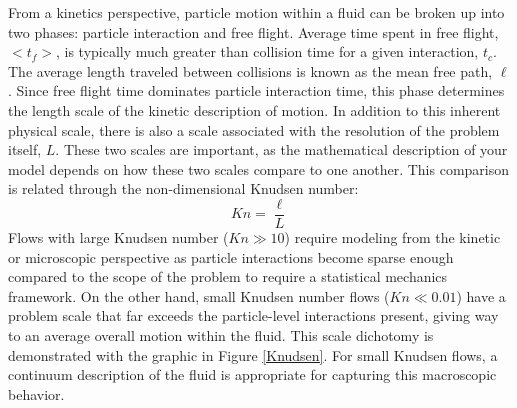 From a kinetics perspective, particle motion within a fluid can be broken up into two phases: particle interaction and free flight. Average time spent in free flight, $<t_f>$, is typically much greater than collision time for a given interaction, $t_c$. The average length traveled between collisions is known as the mean free path, $\ell$.  Since free flight time dominates particle interaction time, this phase determines the length scale of the kinetic description of motion. In addition to this inherent physical scale, there is also a scale associated with the resolution of the problem itself, $L$. These two scales are important, as the mathematical description of your model depends on how these two scales compare to one another. This comparison is related through the non-dimensional Knudsen number: 
\begin{equation}\label{Knudsen}
Kn = \dfrac{\ell}{L}
\end{equation} 
Flows with large Knudsen number ($Kn \gg 10$) require modeling from the kinetic or microscopic perspective as particle interactions become sparse enough compared to the scope of the problem to require a statistical mechanics framework. On the other hand, small Knudsen number flows ($Kn \ll 0.01$) have a problem scale that far exceeds the particle-level interactions present, giving way to an average overall motion within the fluid. This scale dichotomy is demonstrated with the graphic in Figure \ref{Knudsen}. For small Knudsen flows, a continuum description of the fluid is appropriate for capturing this macroscopic behavior. 

